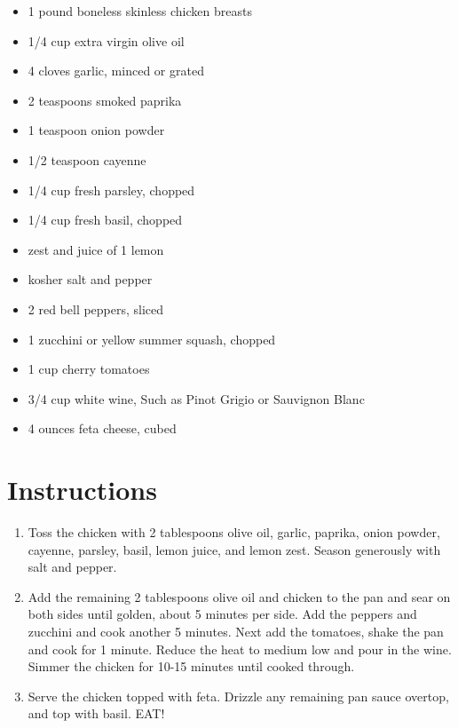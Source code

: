 \documentclass[
  letterpaper,
  DIV=11,
  numbers=noendperiod,
  titlepage=false]{scrreprt}
\providecommand{\tightlist}{%
  \setlength{\itemsep}{0pt}\setlength{\parskip}{0pt}}\usepackage{longtable,booktabs,array}
\begin{document}
\begin{itemize}
\tightlist
\item
  1 pound boneless skinless chicken breasts
\item
  1/4 cup extra virgin olive oil
\item
  4 cloves garlic, minced or grated
\item
  2 teaspoons smoked paprika
\item
  1 teaspoon onion powder
\item
  1/2 teaspoon cayenne
\item
  1/4 cup fresh parsley, chopped
\item
  1/4 cup fresh basil, chopped
\item
  zest and juice of 1 lemon
\item
  kosher salt and pepper
\item
  2 red bell peppers, sliced
\item
  1 zucchini or yellow summer squash, chopped
\item
  1 cup cherry tomatoes
\item
  3/4 cup white wine, Such as Pinot Grigio or Sauvignon Blanc
\item
  4 ounces feta cheese, cubed
\end{itemize}

\section{Instructions}\label{instructions-6}

\begin{enumerate}
\def\labelenumi{\arabic{enumi}.}
\tightlist
\item
  Toss the chicken with 2 tablespoons olive oil, garlic, paprika, onion
  powder, cayenne, parsley, basil, lemon juice, and lemon zest. Season
  generously with salt and pepper.
\item
  Add the remaining 2 tablespoons olive oil and chicken to the pan and
  sear on both sides until golden, about 5 minutes per side. Add the
  peppers and zucchini and cook another 5 minutes. Next add the
  tomatoes, shake the pan and cook for 1 minute. Reduce the heat to
  medium low and pour in the wine. Simmer the chicken for 10-15 minutes
  until cooked through.
\item
  Serve the chicken topped with feta. Drizzle any remaining pan sauce
  overtop, and top with basil. EAT!
\end{enumerate}

\end{document}
